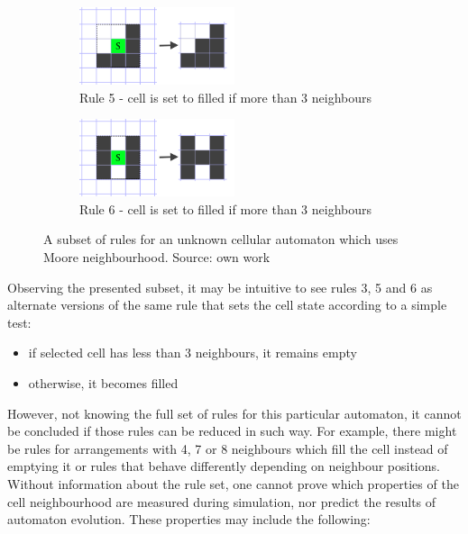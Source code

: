 \documentclass[12pt]{report}
\begin{document}
\begin{figure}[h]
\begin{subfigure}[b]{0.4\textwidth}
	\end{subfigure} 
	\hfill
	\begin{subfigure}[b]{0.4\textwidth}
		\centering
		\includegraphics[width=0.5\textwidth]{images/rule5alive}
		\caption{Rule 5 - cell is set to filled if more than 3 neighbours} 
	\end{subfigure} 
	\hfill
	\begin{subfigure}[b]{0.4\textwidth}
		\centering
		\includegraphics[width=0.5\textwidth]{images/rule6alive}
		\caption{Rule 6 - cell is set to filled if more than 3 neighbours} 
	\end{subfigure} 
	\hfill
	\caption{A subset of rules for an unknown cellular automaton which uses Moore neighbourhood. Source: own work}
	\label{fig:examplecarules}
\end{figure}

Observing the presented subset, it may be intuitive to see rules 3, 5 and 6 as alternate versions of the same rule that sets the cell state according to a simple test: 
\begin{itemize}
	\item if selected cell has less than 3 neighbours, it remains empty
	\item otherwise, it becomes filled
\end{itemize} 
However, not knowing the full set of rules for this particular automaton, it cannot be concluded if those rules can be reduced in such way. For example, there might be rules for arrangements with 4, 7 or 8 neighbours which fill the cell instead of emptying it or rules that behave differently depending on neighbour positions. Without information about the rule set, one cannot prove which properties of the cell neighbourhood are measured during simulation, nor predict the results of automaton evolution. These properties may include the following:
\end{document}
